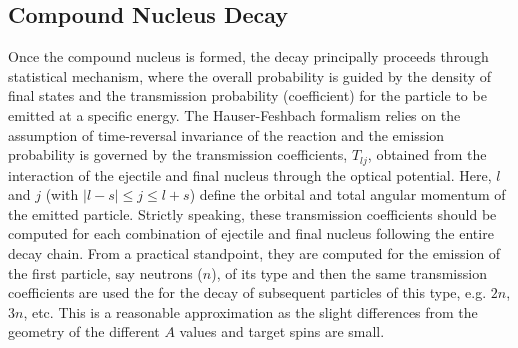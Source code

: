 \documentclass[
10pt,
showpacs,preprintnumbers,footinbib,
amsfonts,amsmath,amssymb,
aps,
prc,twocolumn,groupedaddress,superscriptaddress,
showkeys,
nofootinbib
]{revtex4-1}
\begin{document}
\subsection{Compound Nucleus Decay}
Once the compound nucleus is formed, the decay principally proceeds through statistical mechanism, where the overall probability is guided by the density of final states and the transmission probability (coefficient) for the particle to be emitted at a specific energy. The Hauser-Feshbach formalism relies on the assumption of time-reversal invariance of the reaction and the emission probability is governed by the transmission coefficients, $T_{lj}$, obtained from the interaction of the ejectile and final nucleus through the optical potential. Here, $l$ and $j$ (with $|l-s| \le j \le l+s $) define the orbital and total angular momentum of the emitted particle. Strictly speaking, these transmission coefficients should be computed for each combination of ejectile and final nucleus following the entire decay chain. From a practical standpoint, they are computed for the emission of the first particle, say neutrons ($n$), of its type and then the same transmission coefficients are used the for the decay of subsequent particles of this type, e.g. $2n$, $3n$, etc. This is a reasonable approximation as the slight differences from the geometry of the different $A$ values and target spins are small.
\end{document}
